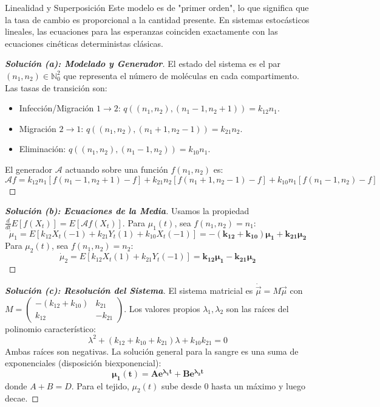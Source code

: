 \documentclass[10pt,a4paper]{article}
\begin{document}
\vspace{2mm}

\begin{nota}{Linealidad y Superposición}
    Este modelo es de "primer orden", lo que significa que la tasa de cambio es proporcional a la cantidad presente. En sistemas estocásticos lineales, las ecuaciones para las esperanzas coinciden exactamente con las ecuaciones cinéticas deterministas clásicas.
\end{nota}

\begin{proof}[\textbf{Solución (a): Modelado y Generador}]
    El estado del sistema es el par $(n_1, n_2) \in \mathbb{N}_0^2$ que representa el número de moléculas en cada compartimento. Las tasas de transición son:
    \begin{itemize}
        \item Infección/Migración $1 \to 2$: $q((n_1, n_2), (n_1-1, n_2+1)) = k_{12} n_1$.
        \item Migración $2 \to 1$: $q((n_1, n_2), (n_1+1, n_2-1)) = k_{21} n_2$.
        \item Eliminación: $q((n_1, n_2), (n_1-1, n_2)) = k_{10} n_1$.
    \end{itemize}
    El generador $\mathcal{A}$ actuando sobre una función $f(n_1, n_2)$ es:
    \[ \mathcal{A}f = k_{12}n_1[f(n_1-1, n_2+1)-f] + k_{21}n_2[f(n_1+1, n_2-1)-f] + k_{10}n_1[f(n_1-1, n_2)-f] \]
\end{proof}

\vspace{5mm}

\begin{proof}[\textbf{Solución (b): Ecuaciones de la Media}]
    Usamos la propiedad $\frac{d}{dt} E[f(X_t)] = E[\mathcal{A}f(X_t)]$. 
    Para $\mu_1(t)$, sea $f(n_1, n_2) = n_1$:
    \[ \dot{\mu}_1 = E[k_{12}X_t(-1) + k_{21}Y_t(1) + k_{10}X_t(-1)] = \mathbf{-(k_{12} + k_{10})\mu_1 + k_{21}\mu_2} \]
    Para $\mu_2(t)$, sea $f(n_1, n_2) = n_2$:
    \[ \dot{\mu}_2 = E[k_{12}X_t(1) + k_{21}Y_t(-1)] = \mathbf{k_{12}\mu_1 - k_{21}\mu_2} \]
\end{proof}

\vspace{5mm}

\begin{proof}[\textbf{Solución (c): Resolución del Sistema}]
    El sistema matricial es $\dot{\vec{\mu}} = M\vec{\mu}$ con $M = \begin{pmatrix} -(k_{12}+k_{10}) & k_{21} \\ k_{12} & -k_{21} \end{pmatrix}$.
    Los valores propios $\lambda_1, \lambda_2$ son las raíces del polinomio característico:
    \[ \lambda^2 + (k_{12}+k_{10}+k_{21})\lambda + k_{10}k_{21} = 0 \]
    Ambas raíces son negativas. La solución general para la sangre es una suma de exponenciales (disposición biexponencial):
    \[ \mathbf{\mu_1(t) = A e^{\lambda_1 t} + B e^{\lambda_2 t}} \]
    donde $A+B=D$. Para el tejido, $\mu_2(t)$ sube desde 0 hasta un máximo y luego decae.
\end{proof}
\end{document}

